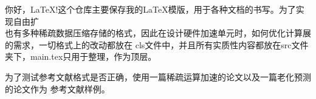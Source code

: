 你好，\LaTeX!这个仓库主要保存我的\LaTeX 模版，用于各种文档的书写。为了实现自由扩\\也有多种稀疏数据压缩存储的格式，因此在设计硬件加速单元时，如何优化计算展的需求，一切格式上的改动都放在
cls文件中，并且所有实质性内容都放在src文件夹下，main.tex只用于整理，作为顶层。

为了测试参考文献格式是否正确，使用一篇稀疏运算加速的论文以及一篇老化预测的论文作为
参考文献样例。